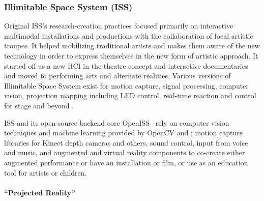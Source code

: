 \subsubsection{Illimitable Space System (ISS)}

Original ISS's research-creation practices focused primarily on interactive multimodal 
installations and productions with the collaboration of local artistic 
troupes. It helped mobilizing traditional artists and makes them aware of the 
new technology in order to express themselves in the new form of artistic 
approach. It started off as a new HCI in the theatre concept and interactive 
documentaries and moved to performing arts and alternate realities. Various 
versions of Illimitable Space System exist for motion capture, signal 
processing, computer vision, projection mapping including LED control, real-time
reaction and control for stage and beyond
\cite{%
msong-phdthesis-2012,%
iss-v3-ar-vr-sa2016,%
multicamtk-siggraph2016,%
iss-v2-design-theory-journal,%
rapid-multimodal-apps-course-siggraph2017%
}.

ISS and its open-source backend core OpenISS~\cite{openiss} rely on computer vision techniques and machine learning
provided by OpenCV and {\marf}; motion capture libraries for Kinect depth cameras and 
others, sound control, input from voice and music, and augmented and virtual 
reality components to co-create either augmented performance or have an 
installation or film, or use as an education tool for artists \cite{rapid-multimodal-apps-course-siggraph2017} or children.

\paragraph{``Projected Reality''}

